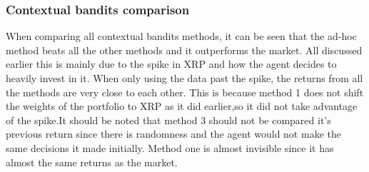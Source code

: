 \documentclass[a4paper,12pt]{article}
\begin{document}
\subsubsection{Contextual bandits comparison}
When comparing all contextual bandits methods, it can be seen that the ad-hoc method beats all the other methods and it outperforms the market. All discussed earlier this is mainly due to the spike in XRP and how the agent decides to heavily invest in it. When only using the data past the spike, the returns from all the methods are very close to each other. This is because method 1 does not shift the weights of the portfolio to XRP as it did earlier,so it did not take advantage of the spike.It should be noted that method 3 should not be compared it’s previous return since there is randomness and the agent would not make the same decisions it made initially. Method one is almost invisible since it has almost the same returns as the market. 
\end{document}
